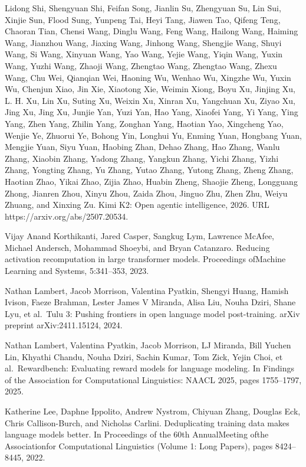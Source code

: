 \documentclass[
  10
]{article}
\begin{document}
Lidong Shi, Shengyuan Shi, Feifan Song, Jianlin Su, Zhengyuan Su, Lin
Sui, Xinjie Sun, Flood Sung, Yunpeng Tai, Heyi Tang, Jiawen Tao, Qifeng
Teng, Chaoran Tian, Chensi Wang, Dinglu Wang, Feng Wang, Hailong Wang,
Haiming Wang, Jianzhou Wang, Jiaxing Wang, Jinhong Wang, Shengjie Wang,
Shuyi Wang, Si Wang, Xinyuan Wang, Yao Wang, Yejie Wang, Yiqin Wang,
Yuxin Wang, Yuzhi Wang, Zhaoji Wang, Zhengtao Wang, Zhengtao Wang, Zhexu
Wang, Chu Wei, Qianqian Wei, Haoning Wu, Wenhao Wu, Xingzhe Wu, Yuxin
Wu, Chenjun Xiao, Jin Xie, Xiaotong Xie, Weimin Xiong, Boyu Xu, Jinjing
Xu, L. H. Xu, Lin Xu, Suting Xu, Weixin Xu, Xinran Xu, Yangchuan Xu,
Ziyao Xu, Jing Xu, Jing Xu, Junjie Yan, Yuzi Yan, Hao Yang, Xiaofei
Yang, Yi Yang, Ying Yang, Zhen Yang, Zhilin Yang, Zonghan Yang, Haotian
Yao, Xingcheng Yao, Wenjie Ye, Zhuorui Ye, Bohong Yin, Longhui Yu,
Enming Yuan, Hongbang Yuan, Mengjie Yuan, Siyu Yuan, Haobing Zhan, Dehao
Zhang, Hao Zhang, Wanlu Zhang, Xiaobin Zhang, Yadong Zhang, Yangkun
Zhang, Yichi Zhang, Yizhi Zhang, Yongting Zhang, Yu Zhang, Yutao Zhang,
Yutong Zhang, Zheng Zhang, Haotian Zhao, Yikai Zhao, Zijia Zhao, Huabin
Zheng, Shaojie Zheng, Longguang Zhong, Jianren Zhou, Xinyu Zhou, Zaida
Zhou, Jinguo Zhu, Zhen Zhu, Weiyu Zhuang, and Xinxing Zu. Kimi K2: Open
agentic intelligence, 2026. URL https://arxiv.org/abs/2507.20534.

Vijay Anand Korthikanti, Jared Casper, Sangkug Lym, Lawrence McAfee,
Michael Andersch, Mohammad Shoeybi, and Bryan Catanzaro. Reducing
activation recomputation in large transformer models. Proceedings
ofMachine Learning and Systems, 5:341--353, 2023.

Nathan Lambert, Jacob Morrison, Valentina Pyatkin, Shengyi Huang, Hamish
Ivison, Faeze Brahman, Lester James V Miranda, Alisa Liu, Nouha Dziri,
Shane Lyu, et al.~Tulu 3: Pushing frontiers in open language model
post-training. arXiv preprint arXiv:2411.15124, 2024.

Nathan Lambert, Valentina Pyatkin, Jacob Morrison, LJ Miranda, Bill
Yuchen Lin, Khyathi Chandu, Nouha Dziri, Sachin Kumar, Tom Zick, Yejin
Choi, et al.~Rewardbench: Evaluating reward models for language
modeling. In Findings of the Association for Computational Linguistics:
NAACL 2025, pages 1755--1797, 2025.

Katherine Lee, Daphne Ippolito, Andrew Nystrom, Chiyuan Zhang, Douglas
Eck, Chris Callison-Burch, and Nicholas Carlini. Deduplicating training
data makes language models better. In Proceedings of the 60th
AnnualMeeting ofthe Associationfor Computational Linguistics (Volume 1:
Long Papers), pages 8424--8445, 2022.
\end{document}
